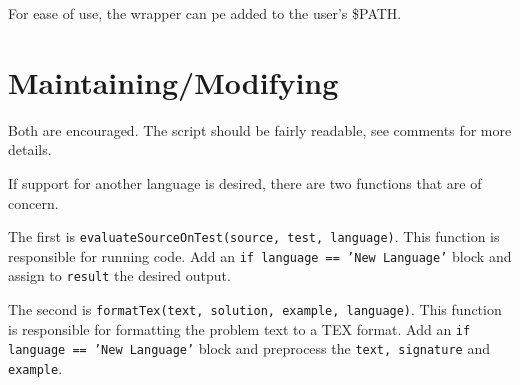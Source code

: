 \documentclass[a4paper,12pt]{article}
\begin{document}
For ease of use, the wrapper can pe added to the user's \$PATH.

\section{Maintaining/Modifying}

Both are encouraged. The script should be fairly readable, see comments for more details. 

If support for another language is desired, there are two functions that are of concern. 

The first is \texttt{evaluateSourceOnTest(source, test, language)}. This function is responsible for running code. Add an \texttt{if language == 'New Language'} block and assign to \texttt{result} the desired output.

The second is \texttt{formatTex(text, solution, example, language)}. This function is responsible for formatting the problem text to a TEX format. Add an \texttt{if language == 'New Language'} block and preprocess the \texttt{text, signature} and \texttt{example}.
\end{document}
